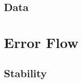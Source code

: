 \documentclass[letterpaper,twocolumn,amsmath,amsfont,amssymb,english,aps,jcp,preprintnumbers,groupaddress,nofootinbib,tightenlines,floatfix]{revtex4}
\newcommand{\mat}[1]{\boldsymbol{#1}}
\theoremstyle{plain}
\theoremstyle{remark}
\theoremstyle{plain}
\begin{document}

\subsection{Data} \label{data}

\section{Error Flow}%

\subsection{Stability}\label{stability}

\end{document}

